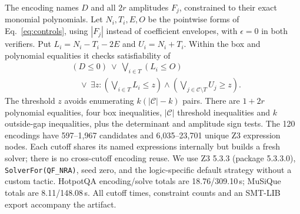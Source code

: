 The encoding names $D$ and all $2r$ amplitudes $F_j$, constrained to their exact monomial polynomials. Let $N_i,T_i,E,O$ be the pointwise forms of Eq.~\eqref{eq:controls}, using $|F_j|$ instead of coefficient envelopes, with $\epsilon=0$ in both verifiers. Put $L_i=N_i-T_i-2E$ and $U_i=N_i+T_i$. Within the box and polynomial equalities it checks satisfiability of
\begin{equation}
\begin{aligned}
 &(D\leq0)\ \lor\ \bigvee_{i\in T}(L_i\leq O)\\
 &\quad\lor\ \exists z:\left(\bigvee_{i\in T}L_i\leq z\right)
              \land\left(\bigvee_{j\in\mathcal C\setminus T}U_j\geq z\right).
\end{aligned}
\label{eq:smt-encoding}
\end{equation}
The threshold $z$ avoids enumerating $k(|\mathcal C|-k)$ pairs. There are $1+2r$ polynomial equalities, four box inequalities, $|\mathcal C|$ threshold inequalities and $k$ outside-gap inequalities, plus the determinant and amplitude sign tests. The 120 encodings have 597--1,967 candidates and 6,035--23,701 unique Z3 expression nodes. Each cutoff shares its named expressions internally but builds a fresh solver; there is no cross-cutoff encoding reuse. We use Z3 5.3.3 (package 5.3.3.0), \texttt{SolverFor(QF\_NRA)}, seed zero, and the logic-specific default strategy without a custom tactic. HotpotQA encoding/solve totals are 18.76/309.10\,s; MuSiQue totals are 8.11/148.08\,s. All cutoff times, constraint counts and an SMT-LIB export accompany the artifact.
